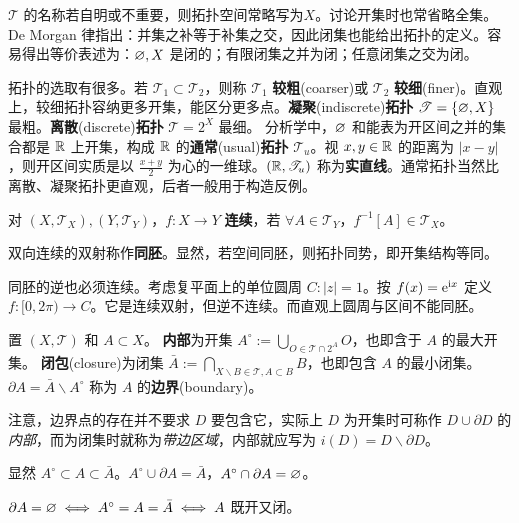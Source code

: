 $\mathscr T$ 的名称若自明或不重要，则拓扑空间常略写为$X$。讨论开集时也常省略全集。De Morgan 律指出：并集之补等于补集之交，因此闭集也能给出拓扑的定义。容易得出等价表述为：$\varnothing,X$ 是闭的；有限闭集之并为闭；任意闭集之交为闭。

拓扑的选取有很多。若 $\mathscr T_1\subset\mathscr T_2$，则称 $\mathscr T_1$ \textbf{较粗}(coarser)或 $\mathscr T_2$ \textbf{较细}(finer)。直观上，较细拓扑容纳更多开集，能区分更多点。\textbf{凝聚}(indiscrete)\textbf{拓扑} $\mathscr T=\{\varnothing,X\}$ 最粗。\textbf{离散}(discrete)\textbf{拓扑} $\mathscr T= 2^X$ 最细。
分析学中，$\varnothing$ 和能表为开区间之并的集合都是 $\mathbb{R}$ 上开集，构成 $\mathbb{R}$ 的\textbf{通常}(usual)\textbf{拓扑} $\mathscr T_u$。视 $x,y\in\mathbb{R}$ 的距离为 $|x-y|$，则开区间实质是以 $\frac{x+y}{2}$ 为心的一维球。$(\mathbb{R},\mathscr T_u)$ 称为\textbf{实直线}。通常拓扑当然比离散、凝聚拓扑更直观，后者一般用于构造反例。

\begin{definition}
    对 $(X,\mathscr T_X),(Y,\mathscr T_Y)$，$f: X \to Y$ \textbf{连续}，若 $\forall A\in\mathscr T_Y$，$f^{-1}[A]\in \mathscr T_X$。
\end{definition}

\begin{definition}
    双向连续的双射称作\textbf{同胚}。显然，若空间同胚，则拓扑同势，即开集结构等同。
\end{definition}

\begin{remark}
    同胚的逆也必须连续。考虑复平面上的单位圆周 $C:|z|=1$。按 $f(x)=\mathrm{e}^{\mathrm{i} x}$ 定义 $f:[0,2\pi)\to C$。它是连续双射，但逆不连续。而直观上圆周与区间不能同胚。
\end{remark}


\begin{definition}
置 $(X,\mathscr T)$ 和 $A\subset X$。
\textbf{内部}为开集 $A^\circ:=\bigcup_{O\in\mathscr T\cap 2^A} O$，也即含于 $A$ 的最大开集。
\textbf{闭包}(closure)为闭集 $\bar{A}:=\bigcap_{X\backslash B\in\mathscr T,A\subset B} B$，也即包含 $A$ 的最小闭集。
$\partial A=\bar{A}\backslash A^\circ$ 称为 $A$ 的\textbf{边界}(boundary)。
\end{definition}


注意，边界点的存在并不要求 $D$ 要包含它，实际上 $D$ 为开集时可称作 $D\cup\partial D$ 的\textit{内部}，而为闭集时就称为\textit{带边区域}，内部就应写为 $i(D)=D\backslash\partial D$。


\begin{remark}
    显然 $A^\circ\subset A\subset \bar A$。$A^\circ\cup\partial A=\bar A$，$A^\circ\cap\partial A=\varnothing$。
    
    $\partial A=\varnothing\iff A^\circ=A=\bar A\iff A$ 既开又闭。
\end{remark}


